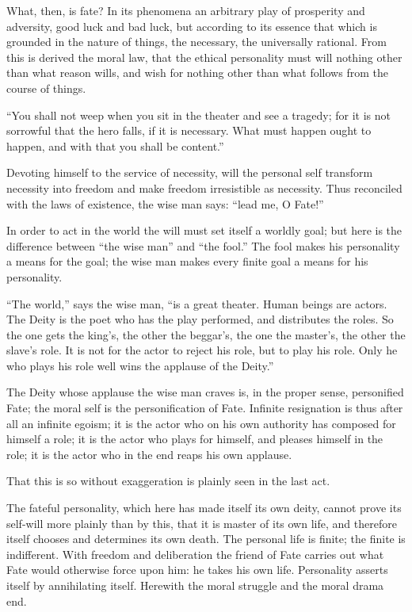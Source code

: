\documentclass[12pt,a4paper,openany]{book}
\newcommand{\opage}[1]{\marginnote{\footnotesize\textit{[#1]}}}
\begin{document}
What, then, is fate? In its phenomena
an arbitrary play of prosperity and adversity,
good luck and bad luck, but according to its essence that
which is grounded in the nature of things, the necessary,
the universally rational. From this is derived the moral
law, that the ethical personality must
will nothing other than what reason wills, and
wish for nothing other than what follows from the course of
things.

``You shall not weep when you sit in
the theater and see a tragedy; for it is not
sorrowful that the hero falls, if it is necessary.  %
What must happen ought to happen, and
with that you shall be content.''

Devoting himself to the service of necessity,
\setcounter{footnote}{0}%
\opage{19}will the personal self transform necessity
into freedom and make freedom irresistible
as necessity. Thus reconciled with
the laws of existence, the wise man says: ``lead me,
O Fate!''

In order to act in the world the will must set itself
a worldly goal; but here is the difference between
``the wise man'' and ``the fool.'' The fool makes
his personality a means for the goal; the
wise man makes every finite goal a means for
his personality.

``The world,'' says the wise man, ``is a great theater.
Human beings are actors. The Deity
is the poet who has the play performed, and
distributes the roles. So the one gets the king's,
the other the beggar's, the one the master's,
the other the slave's role. It is not for the actor
to reject his role, but
to play his role. Only he who plays his
role well wins the applause of the Deity.''

The Deity whose applause the wise man craves
is, in the proper sense, personified
Fate; the moral self is the personification
of Fate. Infinite resignation is
\setcounter{footnote}{0}%
\opage{20}thus after all an infinite egoism; it is the actor
who on his own authority has composed for himself
a role; it is the actor who plays for
himself, and pleases himself in the role; it is the
actor who in the end reaps his
own applause.

That this is so without exaggeration
is plainly seen in the last act.

The fateful personality, which here
has made itself its own deity, cannot
prove its self-will more plainly than by this,
that it is master of its own life, and therefore itself
chooses and determines its own death. The personal
life is finite; the finite is indifferent.
With freedom and deliberation the friend of Fate
carries out what Fate would otherwise
force upon him: he takes his own life. Personality
asserts itself by annihilating
itself. Herewith the moral struggle and
the moral drama end.
\end{document}
